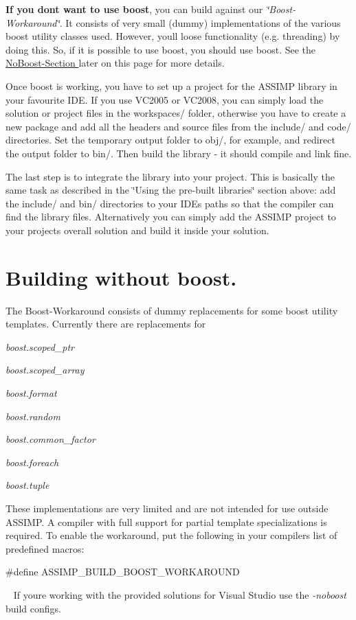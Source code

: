 {\bfseries If you don\textquotesingle{}t want to use boost}, you can build against our {\itshape \char`\"{}\+Boost-\/\+Workaround\char`\"{}}. It consists of very small (dummy) implementations of the various boost utility classes used. However, you\textquotesingle{}ll loose functionality (e.\+g. threading) by doing this. So, if it is possible to use boost, you should use boost. See the \hyperlink{install_use_noboost}{No\+Boost-\/\+Section } later on this page for more details.

Once boost is working, you have to set up a project for the A\+S\+S\+I\+M\+P library in your favourite I\+D\+E. If you use V\+C2005 or V\+C2008, you can simply load the solution or project files in the workspaces/ folder, otherwise you have to create a new package and add all the headers and source files from the include/ and code/ directories. Set the temporary output folder to obj/, for example, and redirect the output folder to bin/. Then build the library -\/ it should compile and link fine.

The last step is to integrate the library into your project. This is basically the same task as described in the \char`\"{}\+Using the pre-\/built libraries\char`\"{} section above\+: add the include/ and bin/ directories to your I\+D\+E\textquotesingle{}s paths so that the compiler can find the library files. Alternatively you can simply add the A\+S\+S\+I\+M\+P project to your project\textquotesingle{}s overall solution and build it inside your solution.\hypertarget{install_use_noboost}{}\section{Building without boost.}\label{install_use_noboost}
The Boost-\/\+Workaround consists of dummy replacements for some boost utility templates. Currently there are replacements for 
\begin{DoxyItemize}
\item {\itshape boost.\+scoped\+\_\+ptr} 
\item {\itshape boost.\+scoped\+\_\+array} 
\item {\itshape boost.\+format}  
\item {\itshape boost.\+random}  
\item {\itshape boost.\+common\+\_\+factor}  
\item {\itshape boost.\+foreach}  
\item {\itshape boost.\+tuple} 
\end{DoxyItemize}These implementations are very limited and are not intended for use outside A\+S\+S\+I\+M\+P. A compiler with full support for partial template specializations is required. To enable the workaround, put the following in your compiler\textquotesingle{}s list of predefined macros\+: 
\begin{DoxyCode}
\textcolor{preprocessor}{#define ASSIMP\_BUILD\_BOOST\_WORKAROUND}
\end{DoxyCode}
 ~\newline
 If you\textquotesingle{}re working with the provided solutions for Visual Studio use the {\itshape -\/noboost} build configs. ~\newline


